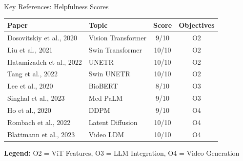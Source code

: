 \documentclass[aspectratio=169]{beamer}
\begin{document}
\begin{frame}{Key References: Helpfulness Scores}
    \begin{center}
        \footnotesize
        \begin{tabular}{@{}p{4.5cm}p{3cm}cc@{}}
            \toprule
            \textbf{Paper} & \textbf{Topic} & \textbf{Score} & \textbf{Objectives} \\
            \midrule
            Dosovitskiy et al., 2020 & Vision Transformer & 9/10 & O2 \\
            Liu et al., 2021 & Swin Transformer & 10/10 & O2 \\
            Hatamizadeh et al., 2022 & UNETR & 10/10 & O2 \\
            Tang et al., 2022 & Swin UNETR & 10/10 & O2 \\
            Lee et al., 2020 & BioBERT & 8/10 & O3 \\
            Singhal et al., 2023 & Med-PaLM & 9/10 & O3 \\
            Ho et al., 2020 & DDPM & 9/10 & O4 \\
            Rombach et al., 2022 & Latent Diffusion & 10/10 & O4 \\
            Blattmann et al., 2023 & Video LDM & 10/10 & O4 \\
            \bottomrule
        \end{tabular}
    \end{center}
    
    \vspace{0.5em}
    \footnotesize
    \textbf{Legend:} O2 = ViT Features, O3 = LLM Integration, O4 = Video Generation
\end{frame}
\end{document}
